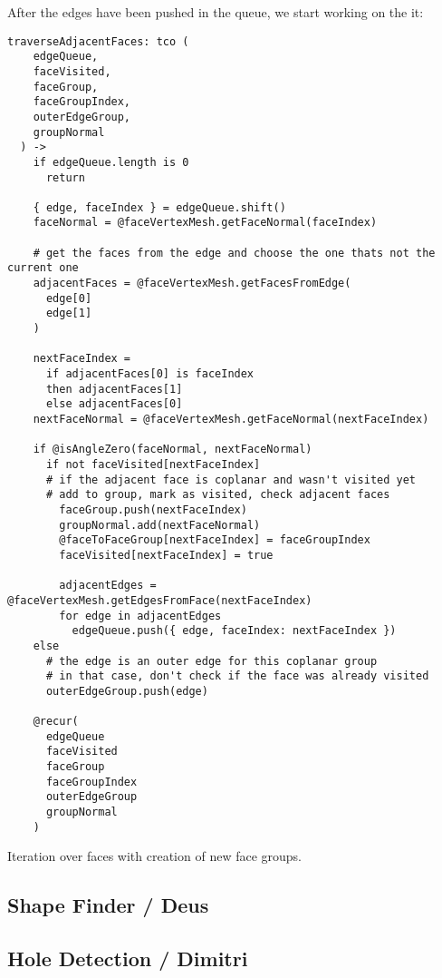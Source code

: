 \documentclass[../ClassicThesis.tex]{subfiles}
\begin{document}
After the edges have been pushed in the queue, we start working on the it:

\begin{listing}[ht]
\begin{verbatim}
traverseAdjacentFaces: tco (
    edgeQueue,
    faceVisited,
    faceGroup,
    faceGroupIndex,
    outerEdgeGroup,
    groupNormal
  ) ->
    if edgeQueue.length is 0
      return

    { edge, faceIndex } = edgeQueue.shift()
    faceNormal = @faceVertexMesh.getFaceNormal(faceIndex)

    # get the faces from the edge and choose the one thats not the current one
    adjacentFaces = @faceVertexMesh.getFacesFromEdge(
      edge[0]
      edge[1]
    )

    nextFaceIndex =
      if adjacentFaces[0] is faceIndex
      then adjacentFaces[1]
      else adjacentFaces[0]
    nextFaceNormal = @faceVertexMesh.getFaceNormal(nextFaceIndex)

    if @isAngleZero(faceNormal, nextFaceNormal)
      if not faceVisited[nextFaceIndex]
      # if the adjacent face is coplanar and wasn't visited yet
      # add to group, mark as visited, check adjacent faces
        faceGroup.push(nextFaceIndex)
        groupNormal.add(nextFaceNormal)
        @faceToFaceGroup[nextFaceIndex] = faceGroupIndex
        faceVisited[nextFaceIndex] = true

        adjacentEdges = @faceVertexMesh.getEdgesFromFace(nextFaceIndex)
        for edge in adjacentEdges
          edgeQueue.push({ edge, faceIndex: nextFaceIndex })
    else
      # the edge is an outer edge for this coplanar group
      # in that case, don't check if the face was already visited
      outerEdgeGroup.push(edge)

    @recur(
      edgeQueue
      faceVisited
      faceGroup
      faceGroupIndex
      outerEdgeGroup
      groupNormal
    )
\end{verbatim}
\caption{Iteration over faces with creation of new face groups.}
\label{lst:coffeescript}
\end{listing}

\subsection{Shape Finder / Deus}



\subsection{Hole Detection / Dimitri}
\end{document}
